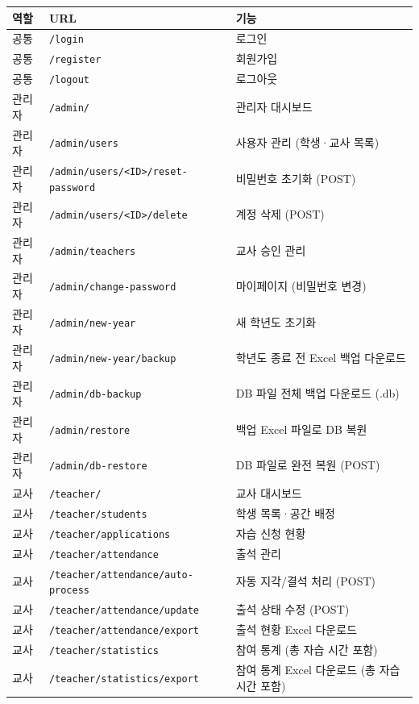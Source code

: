 \documentclass[a4paper,12pt]{article}
\begin{document}
\begin{center}
\begin{tabularx}{\textwidth}{ll>{\raggedright\arraybackslash}X}
\toprule
\textbf{역할} & \textbf{URL} & \textbf{기능} \\
\midrule
공통 & \texttt{/login} & 로그인 \\
공통 & \texttt{/register} & 회원가입 \\
공통 & \texttt{/logout} & 로그아웃 \\
\midrule
관리자 & \texttt{/admin/} & 관리자 대시보드 \\
관리자 & \texttt{/admin/users} & 사용자 관리 (학생·교사 목록) \\
관리자 & \texttt{/admin/users/<ID>/reset-password} & 비밀번호 초기화 (POST) \\
관리자 & \texttt{/admin/users/<ID>/delete} & 계정 삭제 (POST) \\
관리자 & \texttt{/admin/teachers} & 교사 승인 관리 \\
관리자 & \texttt{/admin/change-password} & 마이페이지 (비밀번호 변경) \\
관리자 & \texttt{/admin/new-year} & 새 학년도 초기화 \\
관리자 & \texttt{/admin/new-year/backup} & 학년도 종료 전 Excel 백업 다운로드 \\
관리자 & \texttt{/admin/db-backup} & DB 파일 전체 백업 다운로드 (.db) \\
관리자 & \texttt{/admin/restore} & 백업 Excel 파일로 DB 복원 \\
관리자 & \texttt{/admin/db-restore} & DB 파일로 완전 복원 (POST) \\
\midrule
교사 & \texttt{/teacher/} & 교사 대시보드 \\
교사 & \texttt{/teacher/students} & 학생 목록·공간 배정 \\
교사 & \texttt{/teacher/applications} & 자습 신청 현황 \\
교사 & \texttt{/teacher/attendance} & 출석 관리 \\
교사 & \texttt{/teacher/attendance/auto-process} & 자동 지각/결석 처리 (POST) \\
교사 & \texttt{/teacher/attendance/update} & 출석 상태 수정 (POST) \\
교사 & \texttt{/teacher/attendance/export} & 출석 현황 Excel 다운로드 \\
교사 & \texttt{/teacher/statistics} & 참여 통계 (총 자습 시간 포함) \\
교사 & \texttt{/teacher/statistics/export} & 참여 통계 Excel 다운로드 (총 자습 시간 포함) \\

\end{tabularx}
\end{center}
\end{document}
